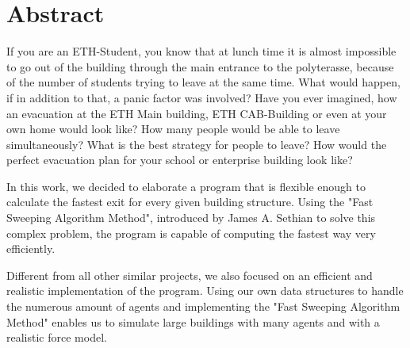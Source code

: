 \documentclass[11pt]{article}
\begin{document}






\tableofcontents

\newpage




\section{Abstract}

If you are an ETH-Student, you know that at lunch time it is almost impossible 
to go out of the building through the main entrance to the polyterasse, because
of the number of students trying to leave at the same time. What would happen,
if in addition to that, a panic factor was involved? Have you ever imagined, how
an evacuation at the ETH Main building, ETH CAB-Building or even at your own home
would look like? How many people would be able to leave simultaneously? What is the
best strategy for people to leave? How would the perfect evacuation plan for your
school or enterprise building look like?


In this work, we decided to elaborate a program that is flexible enough to
calculate the fastest exit for every given building structure. Using the "Fast
Sweeping Algorithm Method", introduced by James A. Sethian\cite{Zhao04afast} to
solve this complex problem, the program is capable of computing the fastest way
very efficiently.


Different from all other similar projects, we also focused on an efficient and
realistic implementation of the program. Using our own data structures to
handle the numerous amount of agents and implementing the "Fast Sweeping
Algorithm Method" enables us to simulate large buildings with many agents and
with a realistic force model.
\end{document}
